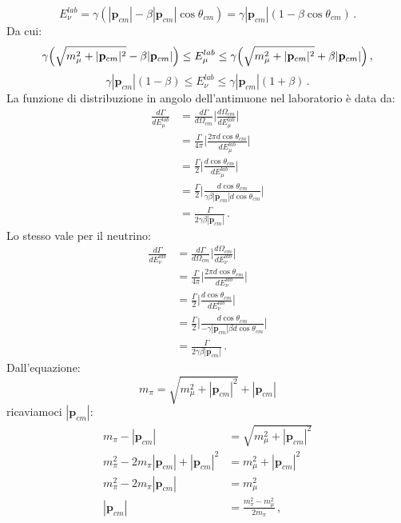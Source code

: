 \documentclass[twoside]{article}
\begin{document}
\begin{equation}
E_\nu^{lab}=\gamma(|\mathbf{p}_{cm}|-\beta|\mathbf{p}_{cm}|\cos\theta_{cm})=\gamma|\mathbf{p}_{cm}|(1-\beta\cos\theta_{cm}) \, .
\end{equation}
Da cui:
\begin{equation}
\gamma \Bigl(\sqrt{m_{\mu}^2+|\mathbf{p}_{cm}|^2}-\beta|\mathbf{p}_{cm}| \Bigr) \leq E_\mu^{lab} \leq \gamma \Bigl(\sqrt{m_{\mu}^2+|\mathbf{p}_{cm}|^2}+\beta|\mathbf{p}_{cm}| \Bigr) \, ,
\end{equation}
\begin{equation}
\gamma|\mathbf{p}_{cm}|(1-\beta) \leq E_\nu^{lab} \leq \gamma|\mathbf{p}_{cm}|(1+\beta) \, .
\end{equation}
La funzione di distribuzione in angolo dell'antimuone nel laboratorio è data da:
\begin{align}
\frac{d\Gamma}{dE_\mu^{lab}}&=\frac{d\Gamma}{d\Omega_{cm}} \biggl \lvert \frac{d\Omega_{cm}}{dE_\mu^{lab}} \biggr \rvert \\
&=\frac{\Gamma}{4\pi} \biggl \lvert \frac{2\pi d \cos \theta_{cm}}{dE_\mu^{lab}} \biggr \rvert \\
&=\frac{\Gamma}{2} \biggl \lvert \frac{d \cos \theta_{cm}}{dE_\mu^{lab}} \biggr \rvert \\
&=\frac{\Gamma}{2} \biggl \lvert \frac{d\cos\theta_{cm}}{\gamma\beta|\mathbf{p}_{cm}| d\cos\theta_{cm}} \biggr \rvert \\
&=\frac{\Gamma}{2\gamma\beta|\mathbf{p}_{cm}|} \, .
\end{align} 
Lo stesso vale per il neutrino:
\begin{align}
\frac{d\Gamma}{dE_\nu^{lab}}&=\frac{d\Gamma}{d\Omega_{cm}} \biggl \lvert \frac{d\Omega_{cm}}{dE_\nu^{lab}} \biggr \rvert \\
&=\frac{\Gamma}{4\pi} \biggl \lvert \frac{2\pi d\cos\theta_{cm}}{dE_\nu^{lab}} \biggr \rvert \\
&=\frac{\Gamma}{2} \biggl \lvert \frac{d\cos\theta_{cm}}{dE_\nu^{lab}} \biggr \rvert \\
&=\frac{\Gamma}{2} \biggl \lvert \frac{d\cos\theta_{cm}}{-\gamma |\mathbf{p}_{cm}|\beta d\cos\theta_{cm}} \biggr \rvert \\
&=\frac{\Gamma}{2\gamma \beta |\mathbf{p}_{cm}| } \, .
\end{align} 
Dall'equazione:
\begin{equation}
m_\pi=\sqrt{m_{\mu}^2+|\mathbf{p}_{cm}|^2}+|\mathbf{p}_{cm}|
\end{equation}
ricaviamoci $|\mathbf{p}_{cm}|$:
\begin{align}
m_\pi-|\mathbf{p}_{cm}|&=\sqrt{m_{\mu}^2+|\mathbf{p}_{cm}|^2} \\
m_\pi^2-2m_\pi|\mathbf{p}_{cm}|+|\mathbf{p}_{cm}|^2&=m_{\mu}^2+|\mathbf{p}_{cm}|^2 \\
m_\pi^2-2m_\pi|\mathbf{p}_{cm}|&=m_{\mu}^2 \\
|\mathbf{p}_{cm}|&=\frac{m_\pi^2-m_{\mu}^2}{2m_\pi} \, ,
\end{align}
\end{document}
